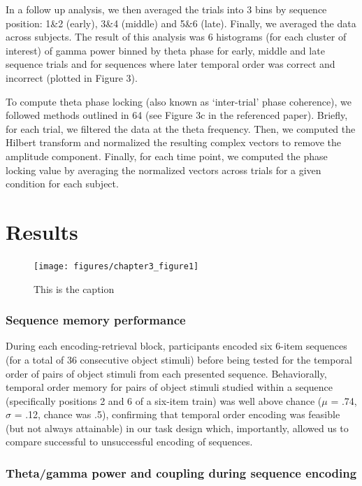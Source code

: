 In a follow up analysis, we then averaged the trials into 3 bins by
sequence position: 1\&2 (early), 3\&4 (middle) and 5\&6 (late). Finally,
we averaged the data across subjects. The result of this analysis was 6
histograms (for each cluster of interest) of gamma power binned by theta
phase for early, middle and late sequence trials and for sequences where
later temporal order was correct and incorrect (plotted in Figure 3).

To compute theta phase locking (also known as `inter-trial' phase
coherence), we followed methods outlined in 64 (see Figure 3c in the
referenced paper). Briefly, for each trial, we filtered the data at the
theta frequency. Then, we computed the Hilbert transform and normalized
the resulting complex vectors to remove the amplitude component.
Finally, for each time point, we computed the phase locking value by
averaging the normalized vectors across trials for a given condition for
each subject.

\section{Results}\label{results}

\begin{figure}[htbp]
\centering
\texttt{[image: figures/chapter3\_figure1]}
\caption{This is the caption}
\end{figure}

\subsubsection{Sequence memory
performance}\label{sequence-memory-performance}

During each encoding-retrieval block, participants encoded six 6-item
sequences (for a total of 36 consecutive object stimuli) before being
tested for the temporal order of pairs of object stimuli from each
presented sequence. Behaviorally, temporal order memory for pairs of
object stimuli studied within a sequence (specifically positions 2 and 6
of a six-item train) was well above chance (\(\mu\) = .74, \(\sigma\) =
.12, chance was .5), confirming that temporal order encoding was
feasible (but not always attainable) in our task design which,
importantly, allowed us to compare successful to unsuccessful encoding
of sequences.

\subsubsection{Theta/gamma power and coupling during sequence
encoding}\label{thetagamma-power-and-coupling-during-sequence-encoding}

